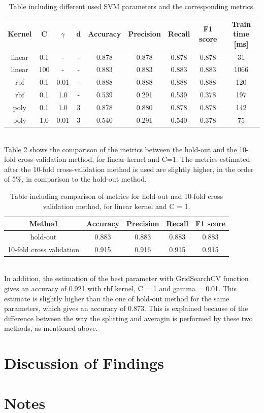 \documentclass{article}
\begin{document}
\begin{table}[h!]
\centering
\begin{tabular}{||c c c c c c c c c||} 
 \hline
 Kernel & C & $\gamma$ &d & Accuracy & Precision & Recall & F1 score & Train time [ms] \\ [0.5ex] 
 \hline\hline
 linear & 0.1 & - & - & 0.878 & 0.878 & 0.878 & 0.878 & 31 \\
 linear & 100 & - & - & 0.883 & 0.883 & 0.883 & 0.883 & 1066 \\
 rbf & 0.1 & 0.01 &- &  0.888 & 0.888 & 0.888 & 0.888 & 120  \\
 rbf & 0.1 & 1.0 & - & 0.539 & 0.291 & 0.539 & 0.378 & 197 \\
 poly & 0.1 &  1.0 &  3 & 0.878 & 0.880 &  0.878 & 0.878 & 142  \\ 
 poly & 1.0 &  0.01 &  3 & 0.540 & 0.291 &  0.540 & 0.378 & 75  \\[1ex] 
 \hline
\end{tabular}
\caption{Table including different used SVM parameters and the corresponding metrics.}
\label{table:machine_SVM}
\end{table}
\\ 
Table \ref{table:machine_SVM_cross} shows the comparison of the metrics between the hold-out and the 10-fold cross-validation method, for linear kernel and C=1. The metrics estimated after the 10-fold cross-validation method is used are slightly higher, in the order of 5$\%$, in comparison to the hold-out method. 
\begin{table}[h!]
\centering
\begin{tabular}{||c c c c c||} 
 \hline
Method &  Accuracy & Precision & Recall & F1 score \\ [0.5ex] 
 \hline\hline
hold-out & 0.883 & 0.883 & 0.883 & 0.883  \\  
 10-fold cross validation &  0.915&  0.916 & 0.915& 0.915 \\ [1ex] 
 \hline
\end{tabular}
\caption{Table including comparison of metrics for hold-out nad 10-fold cross validation method, for linear kernel and C = 1.}
\label{table:machine_SVM_cross}
\end{table}
\\
In addition, the estimation of the best parameter with GridSearchCV function gives an accuracy of 0.921 with rbf kernel, C = 1 and gamma = 0.01. This estimate is slightly higher than the one of hold-out method for the same parameters, which gives an accuracy of 0.873. This is explained because of the difference between the way the splitting and averagin is performed by these two methods, as mentioned above.
\section{Discussion of Findings}



\section{Notes}
\end{document}
